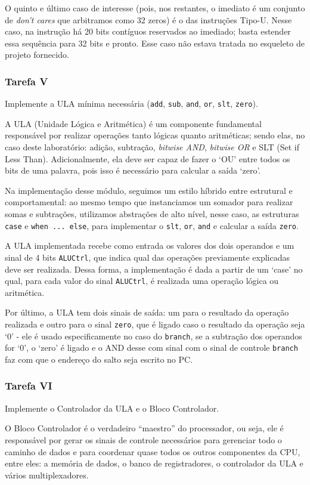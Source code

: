 \documentclass[a4paper,12pt]{article}
\newcommand{\cod}[1]{\texttt{#1}}
\begin{document}
O quinto e último caso de interesse (pois, nos restantes, o imediato é um conjunto de \textit{don't cares} que arbitramos como 32 zeros) é o das instruções Tipo-U. Nesse caso, na instrução há 20 bits contíguos reservados ao imediado; basta estender essa sequência para 32 bits e pronto. Esse caso não estava tratada no esqueleto de projeto fornecido.

\subsubsection{Tarefa V}
\begin{tcolorbox}[title=Enunciado, colback=blue!5!white, colframe=blue!75!black]
Implemente a ULA mínima necessária (\cod{add}, \cod{sub}, \cod{and}, \cod{or}, \cod{slt}, \cod{zero}).
\end{tcolorbox}
A ULA (Unidade Lógica e Aritmética) é um componente fundamental responsável por realizar operações tanto lógicas quanto aritméticas; sendo elas, no caso deste laboratório: adição, subtração, \textit{bitwise AND}, \textit{bitwise OR} e SLT (Set if Less Than). Adicionalmente, ela deve ser capaz de fazer o `OU' entre todos os bits de uma palavra, pois isso é necessário para calcular a saída `zero'.

Na implementação desse módulo, seguimos um estilo híbrido entre estrutural e comportamental: ao mesmo tempo que instanciamos um somador para realizar somas e subtrações, utilizamos abstrações de alto nível, nesse caso, as estruturas \cod{case} e \cod{when ... else}, para implementar o \cod{slt}, \cod{or}, \cod{and} e calcular a saída \cod{zero}.

A ULA implementada recebe como entrada os valores dos dois operandos e um sinal de 4 bits \cod{ALUCtrl}, que indica qual das operações previamente explicadas deve ser realizada. Dessa forma, a implementação é dada a partir de um `case' no qual, para cada valor do sinal \cod{ALUCtrl}, é realizada uma operação lógica ou aritmética.

Por último, a ULA tem dois sinais de saída: um para o resultado da operação realizada e outro para o sinal \cod{zero}, que é ligado caso o resultado da operação seja `0' - ele é usado especificamente no caso do \cod{branch}, se a subtração dos operandos for `0', o `zero' é ligado e o AND desse com sinal com o sinal de controle \cod{branch} faz com que o endereço do salto seja escrito no PC.


\subsubsection{Tarefa VI}
\begin{tcolorbox}[title=Enunciado, colback=blue!5!white, colframe=blue!75!black]
Implemente o Controlador da ULA e o Bloco Controlador.
\end{tcolorbox}
O Bloco Controlador é o verdadeiro ``maestro'' do processador, ou seja, ele é responsável por gerar os sinais de controle necessários para gerenciar todo o caminho de dados e para coordenar quase todos os outros componentes da CPU, entre eles: a memória de dados, o banco de registradores, o controlador da ULA e vários multiplexadores.
\end{document}
